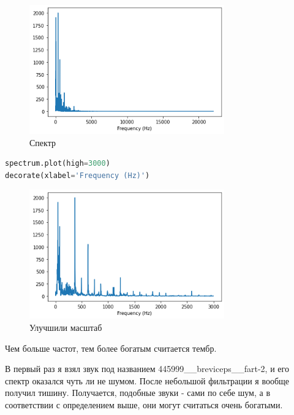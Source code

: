 \documentclass[a4paper,12pt]{report}
\begin{document}
    \begin{figure}[H]
        \centering
        \includegraphics[width=0.75\textwidth]{ex2_spectrum.png}
        \caption{Спектр}
        \label{fig:ex2_spectrum}
    \end{figure}
    
\begin{lstlisting}[language=Python,caption=Улучшаем масштаб]
spectrum.plot(high=3000)
decorate(xlabel='Frequency (Hz)')
\end{lstlisting}

    \begin{figure}[H]
        \centering
        \includegraphics[width=0.75\textwidth]{ex2_spectrum_better.png}
        \caption{Улучшили масштаб}
        \label{fig:ex2_spectrum_better}
    \end{figure}
    
    Чем больше частот, тем более богатым считается тембр.

    В первый раз я взял звук под названием 445999\_\_breviceps\_\_fart-2, и его спектр оказался чуть ли не шумом. После небольшой фильтрации я вообще получил тишину. Получается, подобные звуки - сами по себе шум, а в соответствии с определением выше, они могут считаться очень богатыми.
    
\end{document}
